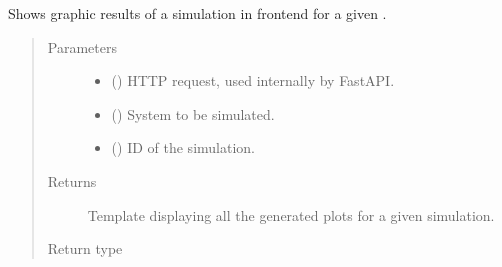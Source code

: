 \documentclass[a4paper,landscape,10pt,english]{sphinxmanual}
\begin{document}
\begin{fulllineitems}
\label{\detokenize{code_docs/simulation_API.controller:simulation_API.controller.main.results_sim_system_sim_id}}
Shows graphic results of a simulation in frontend for a given .
\begin{quote}\begin{description}
\item[{Parameters}] \leavevmode\begin{itemize}
\item {} 
 () \textendash{} HTTP request, used internally by FastAPI.

\item {} 
 ({\hyperref[\detokenize{code_docs/simulation_API.controller:simulation_API.controller.schemas.SimSystem}]{}}) \textendash{} System to be simulated.

\item {} 
 () \textendash{} ID of the simulation.

\end{itemize}

\item[{Returns}] \leavevmode
Template displaying all the generated plots for a given simulation.

\item[{Return type}] \leavevmode
{}

\end{description}\end{quote}

\end{fulllineitems}
\end{document}

